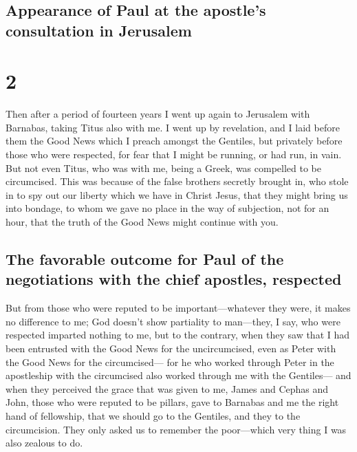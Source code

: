 \hypertarget{appearance-of-paul-at-the-apostles-consultation-in-jerusalem}{%
\subsection{Appearance of Paul at the apostle's consultation in
Jerusalem}\label{appearance-of-paul-at-the-apostles-consultation-in-jerusalem}}

\hypertarget{section-1}{%
\section{2}\label{section-1}}

 Then after a period of fourteen years I went up again to
Jerusalem with Barnabas, taking Titus also with me.  I
went up by revelation, and I laid before them the Good News which I
preach amongst the Gentiles, but privately before those who were
respected, for fear that I might be running, or had run, in vain.
 But not even Titus, who was with me, being a Greek, was
compelled to be circumcised.  This was because of the
false brothers secretly brought in, who stole in to spy out our liberty
which we have in Christ Jesus, that they might bring us into bondage,
 to whom we gave no place in the way of subjection, not
for an hour, that the truth of the Good News might continue with you.

\hypertarget{the-favorable-outcome-for-paul-of-the-negotiations-with-the-chief-apostles-respected}{%
\subsection{The favorable outcome for Paul of the negotiations with the
chief apostles,
respected}\label{the-favorable-outcome-for-paul-of-the-negotiations-with-the-chief-apostles-respected}}

 But from those who were reputed to be
important---whatever they were, it makes no difference to me; God
doesn't show partiality to man---they, I say, who were respected
imparted nothing to me,  but to the contrary, when they
saw that I had been entrusted with the Good News for the uncircumcised,
even as Peter with the Good News for the circumcised--- 
for he who worked through Peter in the apostleship with the circumcised
also worked through me with the Gentiles---  and when they
perceived the grace that was given to me, James and Cephas and John,
those who were reputed to be pillars, gave to Barnabas and me the right
hand of fellowship, that we should go to the Gentiles, and they to the
circumcision.  They only asked us to remember the
poor---which very thing I was also zealous to do.

